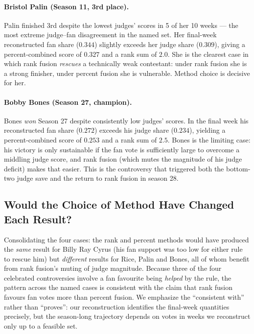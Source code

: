 \documentclass{article}
\begin{document}
\paragraph{Bristol Palin (Season 11, 3rd place).} Palin finished 3rd despite the lowest
judges' scores in 5 of her 10 weeks --- the most extreme judge--fan disagreement in the named
set. Her final-week reconstructed fan share ($0.344$) slightly exceeds her judge share
($0.309$), giving a percent-combined score of $0.327$ and a rank sum of $2.0$. She is the
clearest case in which rank fusion \emph{rescues} a technically weak contestant: under rank
fusion she is a strong finisher, under percent fusion she is vulnerable. Method choice is
decisive for her.

\paragraph{Bobby Bones (Season 27, champion).} Bones \emph{won} Season 27 despite
consistently low judges' scores. In the final week his reconstructed fan share ($0.272$)
exceeds his judge share ($0.234$), yielding a percent-combined score of $0.253$ and a rank
sum of $2.5$. Bones is the limiting case: his victory is only sustainable if the fan vote is
sufficiently large to overcome a middling judge score, and rank fusion (which mutes the
magnitude of his judge deficit) makes that easier. This is the controversy that triggered
both the bottom-two judge save and the return to rank fusion in season 28.

\subsection{Would the Choice of Method Have Changed Each Result?}

Consolidating the four cases: the rank and percent methods would have produced the
\emph{same} result for Billy Ray Cyrus (his fan support was too low for either rule to
rescue him) but \emph{different} results for Rice, Palin and Bones, all of whom benefit from
rank fusion's muting of judge magnitude. Because three of the four celebrated controversies
involve a fan favourite being \emph{helped} by the rule, the pattern across the named cases
is consistent with the claim that rank fusion favours fan votes more than percent fusion. We
emphasize the ``consistent with'' rather than ``proves'': our reconstruction identifies the
final-week quantities precisely, but the season-long trajectory depends on votes in weeks we
reconstruct only up to a feasible set.
\end{document}
